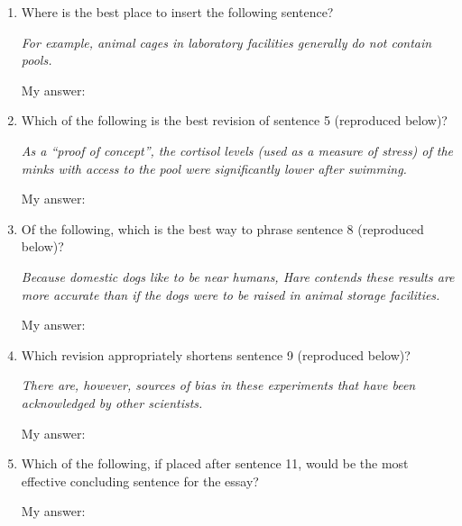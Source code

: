 \begin{enumerate}
\item Where is the best place to insert the following sentence?

\textit{For example, animal cages in laboratory facilities generally do not contain pools.}

My answer: \hrulefill

\vfill

\item Which of the following is the best revision of sentence 5 (reproduced below)?

\textit{As a ``proof of concept'', the cortisol levels (used as a measure of stress) of the minks with access to the pool were significantly lower after swimming.}

My answer: \hrulefill

\vfill

\item Of the following, which is the best way to phrase sentence 8 (reproduced below)?

\textit{Because domestic dogs like to be near humans, Hare contends these results are more accurate than if the dogs were to be raised in animal storage facilities.}

My answer: \hrulefill

\vfill

\item Which revision appropriately shortens sentence 9 (reproduced below)?

\textit{There are, however, sources of bias in these experiments that have been acknowledged by other scientists.}

My answer: \hrulefill

\vfill

\item Which of the following, if placed after sentence 11, would be the most effective concluding sentence for the essay?

My answer: \hrulefill

\end{enumerate}